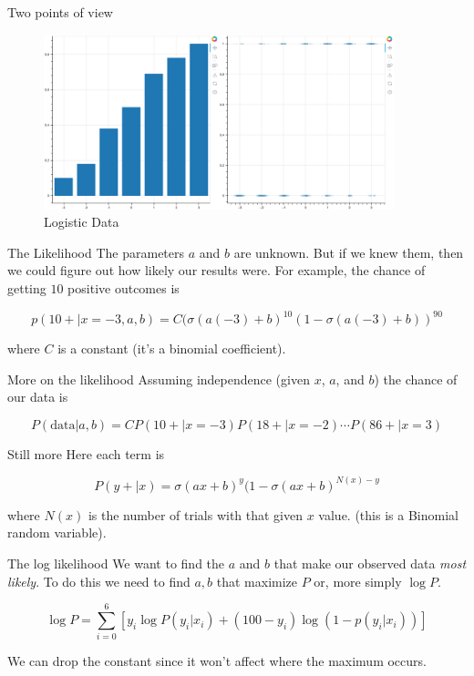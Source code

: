 \documentclass[
  ignorenonframetext,
]{beamer}
\begin{document}
\begin{frame}{Two points of view}
\protect\hypertarget{two-points-of-view}{}
\begin{figure}
\centering
\includegraphics[width=4in,height=\textheight]{logistic_plots.png}
\caption{Logistic Data}
\end{figure}
\end{frame}

\begin{frame}{The Likelihood}
\protect\hypertarget{the-likelihood}{}
The parameters \(a\) and \(b\) are unknown. But if we knew them, then we
could figure out how likely our results were. For example, the chance of
getting \(10\) positive outcomes is

\[
p(10+ | x=-3, a,b) = C(\sigma(a(-3)+b)^{10}(1-\sigma(a(-3)+b))^{90}
\]

where \(C\) is a constant (it's a binomial coefficient).
\end{frame}

\begin{frame}{More on the likelihood}
\protect\hypertarget{more-on-the-likelihood}{}
Assuming independence (given \(x\), \(a\), and \(b\)) the chance of our
data is

\[
P(\mathrm{data}|a,b)=C P(10+|x=-3)P(18+|x=-2)\cdots P(86+|x=3)
\]
\end{frame}

\begin{frame}{Still more}
\protect\hypertarget{still-more}{}
Here each term is

\[
P(y+|x)=\sigma(ax+b)^{y}(1-\sigma(ax+b)^{N(x)-y}
\]

where \(N(x)\) is the number of trials with that given \(x\) value.
(this is a Binomial random variable).
\end{frame}

\begin{frame}{The log likelihood}
\protect\hypertarget{the-log-likelihood}{}
We want to find the \(a\) and \(b\) that make our observed data
\emph{most likely}. To do this we need to find \(a,b\) that maximize
\(P\) or, more simply \(\log P\).

\[
\log P = \sum_{i=0}^{6} \left[ y_{i}\log P(y_{i}|x_{i}) + (100-y_{i})\log(1-p(y_{i}|x_{i}))\right]
\]

We can drop the constant since it won't affect where the maximum occurs.
\end{frame}
\end{document}
